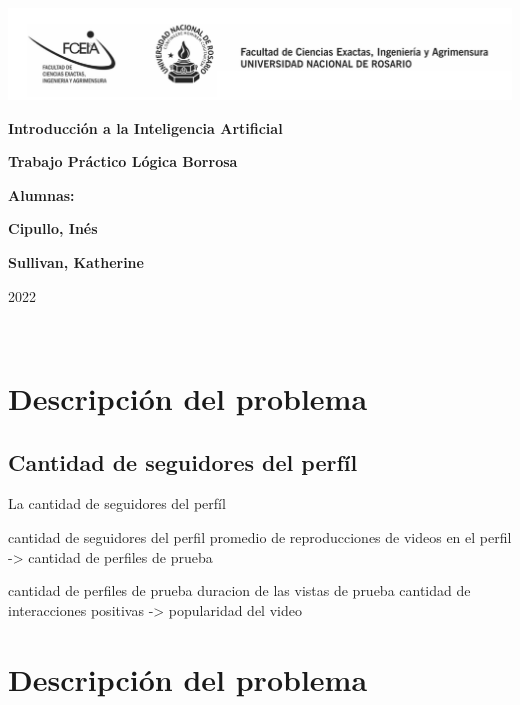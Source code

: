 \documentclass{article}
\begin{document}
\begin{titlepage}
    \hspace{-2.5cm}\includegraphics[scale= 0.48]{header.png}
    \begin{center}
        \vfill
            \noindent\textbf{\Huge Introducción a la Inteligencia Artificial}\par
            \vspace{.5cm}
            \noindent\textbf{\Huge Trabajo Práctico Lógica Borrosa}\par
            \vspace{.5cm}
        \vfill
        \noindent \textbf{\huge Alumnas:}\par
        \vspace{.5cm}
        \noindent \textbf{\Large Cipullo, Inés}\par
        \noindent \textbf{\Large Sullivan, Katherine}\par
 
        \vfill
        \noindent\large 2022
    \end{center}
\end{titlepage}
\ 



\section*{Descripción del problema}

\subsection*{Cantidad de seguidores del perfíl}

La cantidad de seguidores del perfíl

cantidad de seguidores del perfil
promedio de reproducciones de videos en el perfil
-> cantidad de perfiles de prueba


cantidad de perfiles de prueba
duracion de las vistas de prueba
cantidad de interacciones positivas
-> popularidad del video






\section*{Descripción del problema}
\end{document}
